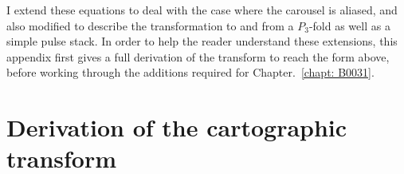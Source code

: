 I extend these equations to deal with the case where the carousel is aliased, and also modified to describe the transformation to and from a $P_3$-fold as well as a simple pulse stack. In order to help the reader understand these extensions, this appendix first gives a full derivation of the transform to reach the form above, before working through the additions required for Chapter.~\ref{chapt: B0031}.









\section{Derivation of the cartographic transform}
\label{app: geometry derivations - cartographic transform}

